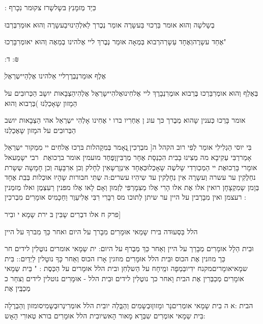 \documentclass[14pt, a5paper, twoside, extrafontsizes]{memoir}
\begin{document}
\begin{hebrew}
: כִּיַד מְזמָנִץ \hdot
 בּשָלשָרז צקוּמר נִכָרף \hdot


בְשָלשָה וְהוּא \hdot
 אוּמר בַּרְכוּי בַּעשָרֶה אומַר
נְכֶרך לַאלְהַינוּיבַעשָרֶה וְהוּא\hdot
 אוּמַרִבְּרְבוּ\hdot

אֶחַד עשָרֶהוְאֶחָד עַשָרְהרְבוא\hdot
 בְּמְאָה אוּמַר
נְבֶרךְ ליי אֶלהינו \hdot
בְמַאֶה וְהוּא יאומְרִבָּרְכוּ"

:ד :₪

ְּאֶלֶף אוּמַרנְבְרֶךליי אַלהינו אֶלְהַיישְרְאֶל \hdot

בְּאֶלַף וְהוּא \hdot
אומְרִבַּרְכוּ\hdot
בֶּרְבוא אומֶרִנְבָרֶךְ
ליי אֶלחִינוּאֶלהִיישָרְאֶל אֶלְהִיהַצְבָאות יושָב
הַכְּרוּבִים על הַמָזון שָאָכַלְנוּ\hdot
)בְּרְבוא וְהוּא\hdot

אומר בָּרְכוּ \hdot
 כְּענין שָהוא מְבֶרך \hdot
 כּך עונ\hdot
ן
אַחְרִיו \hdot
 ברו י אֶחִינו אָלְהִי ישְרְאַל אהי
הַצְבָאוּת יושב הַבְּרוּבִים על המָזון שָאֶכַלְנוּ\hdot

ִבִּי יוסי הַגְלִילִי אומַר לְפִי רוב הקהל ה[
מבְרְכִין ָנְאָמר בְּמִקַהלות בּרְכוּ אֶלחִים יי
מִמַקור ישְרְאַל \hdot
 אָמַררְבִּי עְקִיבָא \hdot
 מה מְצִינוּ
בָבִית הִכַנְסָת אֶחָר מְרְבִּיןְוְפֶחֶד מועמין אומר
ברְכואֶת ‏ \hdot
רבי ישָמַעאל אומָרי בָּרְכוּאֶת יי
הַמְכְורְדִי שָלשֶה שָאָכְלוּכְּאְחָד אִינְןְרשָאִין
לְחָלק \hdot
 וְכן אִרִבָּעָה \hdot
 וְכן חָמָשָה \hdot
 שְשָרת
נחְלֶקִין ער עשרה \hdot
 וְעשָרֶה אִין נִחָלֶקין עד
שִיהִיוּ עשרים:ה שְתִּי חבורות שָהָיוּ אוכְלות
בְּבִִת אֶחָד \hdot
 בְּוָמן שָמִקְצָחָן רואין אלו אֶת
אלו \hdot
 הָרִי אֶלו מַצִמָרְפִּי לְזְמוּן וְאָם לָאו אֶלו
מפּנין רַעִצְמֶן \hdot
 ואלו מְזמְנין רעצמן \hdot
 ואין
מִבָרְבין על היין ער שיתן לְתוכו מס \hdot
 רִבָרִי
רִבִּי אֶלִיעַוֶר \hdot
 וַחַכָמִיס אומָרִים מִבְרכִין :

פרק ח אלו דבְרִים שָבִּין בּ\hdot
ירת שָמָא\hdot
י ובִיר]

הלל בַּסְעוּדה \hdot
 בּירז שָמַאי אוּמָרִים
מִבָרך על היום \hdot
 ואחר כַּךְ מִברךָ על היין \hdot

וּבִית הַלָל אומָרִים מְבָרַך על היין \hdot
 וְאַחר כַּךְ
מְבֶרף על היום: \hdot
 ית שַמָאי אומרים נוטֶלִין
לידים חר כַּך מוזנין אֶת הכוס \hdot
וּבִּית הלל
אוּמָרִים מוזגין אָרז הכוס וְאַחר כָּךָ נוטָלין
לַיְדַיִם:: בִּית שמָאיאומָריםמקנח ידִיובַּמַפָה
ומִַיחָח על הַשלְחִן \hdot
 ובית הלל אוּמָרים על
הַכְּסֶת : " בַּית שַמָאי אומָרִים מְכַבְּרִין אֶת
הבית וָאחר כך נוטֶלִין לידים \hdot
 וּבִית הלל
- אוּמָרִים נוטלין לידים וְצחַר כ מְכַבְִּין אֶת

הבית :א ה בִית שָמָאי אומְרִיםנָר ומָזוןוּבְשָמִים
וְהַבְַּלַה יובִית הלל אומְרִינְרוּבְשָמִיסומזון
וְהַבְרֶלָה \hdot
 בִּית שַמָאי אומְרִים שִבְּרָא מָאור
הָאשיובִית הלל אוּמָרִים בורא טְאורִי הָאָש:


\end{hebrew}
\end{document}
